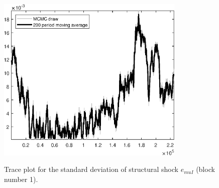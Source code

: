 \begin{figure}[H]
\centering
  \includegraphics[width=0.8\textwidth]{BRS_sectoral/graphs/TracePlot_SE_e_muI_blck_1}\\
    \caption{Trace plot for the standard deviation of structural shock ${e_{muI}}$ (block number 1).}
\end{figure}
